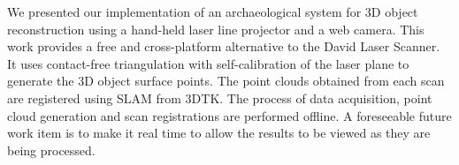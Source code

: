 We presented our implementation of an archaeological system for 3D object
reconstruction using a hand-held laser line projector and a web camera.  This
work provides a free and cross-platform alternative to the David Laser
Scanner. It uses contact-free triangulation with self-calibration of the laser
plane to generate the 3D object surface points. The point clouds obtained from
each scan are registered using \ac{SLAM} from \ac{3DTK}. The process of data
acquisition, point cloud generation and scan registrations are performed
offline. A foreseeable future work item is to make it real time to allow the
results to be viewed as they are being processed.
